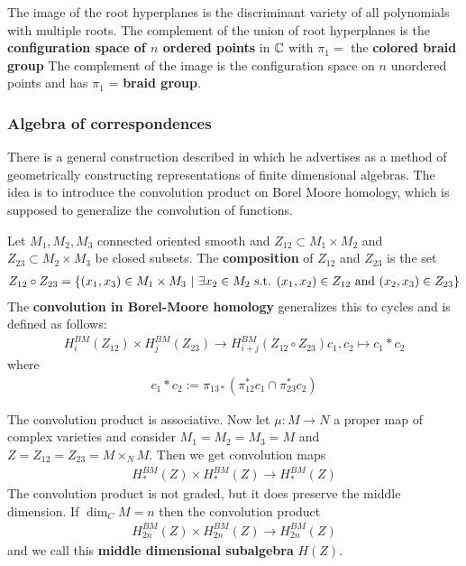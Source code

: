 \documentclass[12pt]{article}
\begin{document}
\begin{remark}
    The image of the root hyperplanes is the discriminant variety of all polynomials
    with multiple roots. The complement of the union of root hyperplanes is
    the \textbf{configuration space of $n$ ordered points} in $\mathbb{C}$ with $\pi_1 = $ the \textbf{
        colored braid group
    } The complement of the image is the configuration space on $n$ unordered points and
    has $\pi_1$ = \textbf{braid group}.
\end{remark}

\subsubsection{Algebra of correspondences}
There is a general construction described in \cite{chriss-ginsburg}
which he advertises as a method of geometrically constructing
representations of finite dimensional algebras. The idea is to
introduce the convolution product on Borel Moore homology, which is
supposed to generalize the convolution of functions.

\begin{definition}
    Let $M_1,M_2,M_3$ connected oriented smooth and $Z_{12}\subset M_1\times M_2$
    and $Z_{23}\subset M_2\times M_3$ be closed subsets. The \textbf{composition} of
    $Z_{12}$ and $Z_{23}$ is the set \begin{align*}
        Z_{12}\circ Z_{23} = \{(x_1,x_3)\in M_1\times M_3 \ \vert \  \exists x_2\in M_2 \text{ s.t. } (x_1,x_2)\in Z_{12} \text{ and } (x_2,x_3)\in Z_{23}\}
    \end{align*}
    The \textbf{convolution in Borel-Moore homology} generalizes
    this to cycles and is defined as follows:
    \begin{align*}
        H^{BM}_i(Z_{12}) \times H^{BM}_j(Z_{23}) \to H^{BM}_{i+j}(Z_{12}\circ Z_{23})
        c_1,c_2 \mapsto c_1 * c_2
    \end{align*} where
    \begin{align*}
        c_1 * c_2 := \pi_{13*}(\pi_{12}^*c_1 \cap \pi_{23}^*c_2)
    \end{align*}
\end{definition}

The convolution product is associative. Now let $\mu:M\to N$ a proper map
of complex varieties and consider $M_1 = M_2 = M_3 = M$ and $Z = Z_{12} = Z_{23}
    = M\times_N M$. Then we get convolution maps \begin{align*}
    H^{BM}_*(Z) \times H^{BM}_*(Z) \to H^{BM}_{*}(Z)
\end{align*} The convolution product is not graded, but it does preserve the
middle dimension. If $\dim_C M = n$ then the convolution product
\begin{align*}
    H^{BM}_{2n}(Z) \times H^{BM}_{2n}(Z) \to H^{BM}_{2n}(Z)
\end{align*} and we call this \textbf{middle dimensional subalgebra} $H(Z)$.
\end{document}
